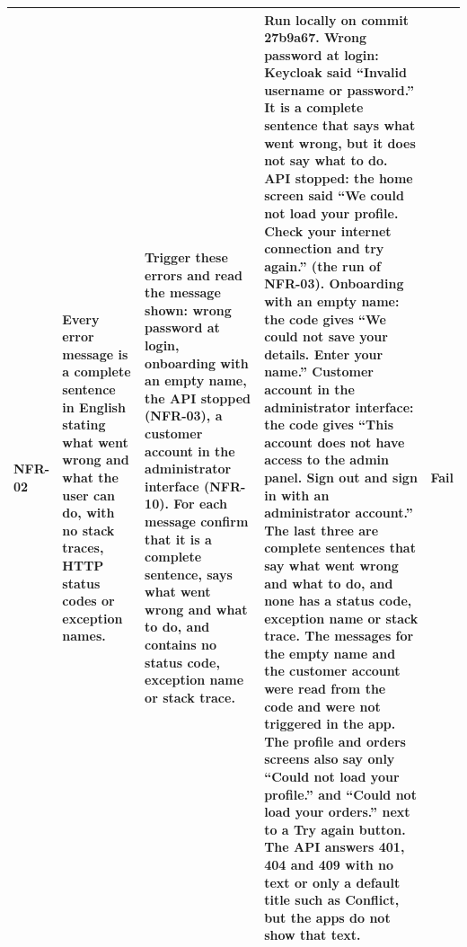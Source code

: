 \documentclass[a4paper,11pt]{article}
\begin{document}
\begin{center}
\begin{tabular}{@{}p{1.2cm}p{3.8cm}p{5.8cm}p{1.7cm}p{1.3cm}@{}}
NFR-02 & Every error message is a complete sentence in English stating what went wrong and what the user can do, with no stack traces, HTTP status codes or exception names. & Trigger these errors and read the message shown: wrong password at login, onboarding with an empty name, the API stopped (NFR-03), a customer account in the administrator interface (NFR-10). For each message confirm that it is a complete sentence, says what went wrong and what to do, and contains no status code, exception name or stack trace. & Run locally on commit 27b9a67. Wrong password at login: Keycloak said ``Invalid username or password.'' It is a complete sentence that says what went wrong, but it does not say what to do. API stopped: the home screen said ``We could not load your profile. Check your internet connection and try again.'' (the run of NFR-03). Onboarding with an empty name: the code gives ``We could not save your details. Enter your name.'' Customer account in the administrator interface: the code gives ``This account does not have access to the admin panel. Sign out and sign in with an administrator account.'' The last three are complete sentences that say what went wrong and what to do, and none has a status code, exception name or stack trace. The messages for the empty name and the customer account were read from the code and were not triggered in the app. The profile and orders screens also say only ``Could not load your profile.'' and ``Could not load your orders.'' next to a Try again button. The API answers 401, 404 and 409 with no text or only a default title such as Conflict, but the apps do not show that text. & Fail \\
\hline
\end{tabular}
\end{center}
\end{document}
